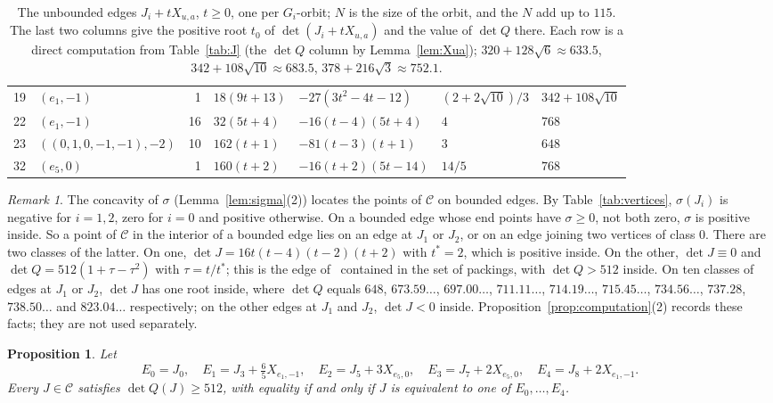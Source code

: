 \documentclass[11pt]{amsart}
\newtheorem{proposition}[theorem]{Proposition}
\theoremstyle{definition}
\theoremstyle{remark}
\newtheorem{remark}[theorem]{Remark}
\numberwithin{equation}{section}
\numberwithin{table}{section}
\numberwithin{figure}{section}
\newcommand{\cand}{\mathcal{C}}
\begin{document}
\begin{table}[t]
\begin{tabular}{@{}r l r l l l l@{}}
19 & $(e_1,-1)$ & 1 & $18(9t+13)$ & $-27(3t^2-4t-12)$ & $(2+2\sqrt{10})/3$ & $342+108\sqrt{10}$\\
22 & $(e_1,-1)$ & 16 & $32(5t+4)$ & $-16(t-4)(5t+4)$ & $4$ & $768$\\
23 & $((0,1,0,-1,-1),-2)$ & 10 & $162(t+1)$ & $-81(t-3)(t+1)$ & $3$ & $648$\\
32 & $(e_5,0)$ & 1 & $160(t+2)$ & $-16(t+2)(5t-14)$ & $14/5$ & $768$\\
\bottomrule
\end{tabular}
\caption{The unbounded edges $J_i+tX_{u,a}$, $t\ge0$, one per $G_i$-orbit; $N$ is the size of the orbit, and the $N$ add up to $115$. The last two columns give the positive root $t_0$ of $\det(J_i+tX_{u,a})$ and the value of $\det Q$ there. Each row is a direct computation from Table~\ref{tab:J} (the $\det Q$ column by Lemma~\ref{lem:Xua}); $320+128\sqrt6\approx633.5$, $342+108\sqrt{10}\approx683.5$, $378+216\sqrt3\approx752.1$.}
\label{tab:unbounded}
\end{table}

\begin{remark}\label{rem:bounded}
The concavity of $\sigma$ (Lemma~\ref{lem:sigma}(2)) locates the points of $\cand$ on bounded edges. By Table~\ref{tab:vertices}, $\sigma(J_i)$ is negative for $i=1,2$, zero for $i=0$ and positive otherwise. On a bounded edge whose end points have $\sigma\ge0$, not both zero, $\sigma$ is positive inside. So a point of $\cand$ in the interior of a bounded edge lies on an edge at $J_1$ or $J_2$, or on an edge joining two vertices of class $0$. There are two classes of the latter. On one, $\det J=16t(t-4)(t-2)(t+2)$ with $t^*=2$, which is positive inside. On the other, $\det J\equiv0$ and $\det Q=512(1+\tau-\tau^2)$ with $\tau=t/t^*$; this is the edge of~\cite[\S4.3]{AK2020} contained in the set of packings, with $\det Q>512$ inside. On ten classes of edges at $J_1$ or $J_2$, $\det J$ has one root inside, where $\det Q$ equals $648$, $673.59\ldots$, $697.00\ldots$, $711.11\ldots$, $714.19\ldots$, $715.45\ldots$, $734.56\ldots$, $737.28$, $738.50\ldots$ and $823.04\ldots$ respectively; on the other edges at $J_1$ and $J_2$, $\det J<0$ inside. Proposition~\ref{prop:computation}(2) records these facts; they are not used separately.
\end{remark}

\begin{proposition}\label{prop:candidates}
Let
\[
E_0=J_0,\quad E_1=J_3+\tfrac65X_{e_1,-1},\quad E_2=J_5+3X_{e_5,0},\quad E_3=J_7+2X_{e_5,0},\quad E_4=J_8+2X_{e_1,-1}.
\]
Every $J\in\cand$ satisfies $\det Q(J)\ge512$, with equality if and only if $J$ is equivalent to one of $E_0,\dots,E_4$.
\end{proposition}
\end{document}

